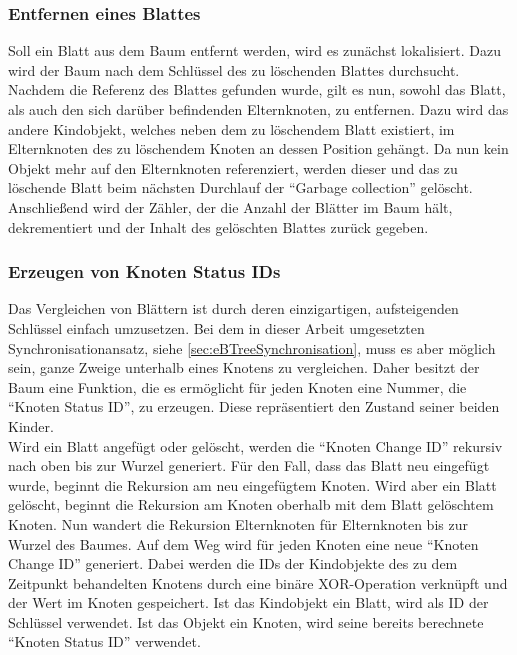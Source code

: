 \documentclass[a4paper,11pt,oneside,%
headsepline,												%
footsepline,												%
bibtotocnumbered									%
]{scrreprt}
\begin{document}
\subsubsection{Entfernen eines Blattes}
Soll ein Blatt aus dem Baum entfernt werden, wird es zunächst lokalisiert. Dazu wird der Baum nach dem Schlüssel des zu löschenden Blattes durchsucht. Nachdem die Referenz des Blattes gefunden wurde, gilt es nun, sowohl das Blatt, als auch den sich darüber befindenden Elternknoten, zu entfernen. Dazu wird das andere Kindobjekt, welches neben dem zu löschendem Blatt existiert, im Elternknoten des  zu löschendem Knoten an dessen Position gehängt. Da nun kein Objekt mehr auf den Elternknoten referenziert, werden dieser und das zu löschende Blatt beim nächsten Durchlauf der \enquote{Garbage collection} gelöscht. Anschließend wird der Zähler, der die Anzahl der Blätter im Baum hält, dekrementiert und der Inhalt des gelöschten Blattes zurück gegeben.
\subsubsection{Erzeugen von Knoten Status IDs}
Das Vergleichen von Blättern ist durch deren einzigartigen, aufsteigenden Schlüssel einfach umzusetzen. Bei dem in dieser Arbeit umgesetzten Synchronisationansatz, siehe \autoref{sec:eBTreeSynchronisation}, muss es aber möglich sein, ganze Zweige unterhalb eines Knotens zu vergleichen. Daher besitzt der Baum eine Funktion, die es ermöglicht für jeden Knoten eine Nummer, die \enquote{Knoten Status ID}, zu erzeugen. Diese repräsentiert den Zustand seiner beiden Kinder.\\ Wird ein Blatt angefügt oder gelöscht, werden die \enquote{Knoten Change ID} rekursiv nach oben bis zur Wurzel generiert. Für den Fall, dass das Blatt neu eingefügt wurde, beginnt die Rekursion am neu eingefügtem Knoten. Wird aber ein Blatt gelöscht, beginnt die Rekursion am Knoten oberhalb mit dem Blatt gelöschtem Knoten. Nun wandert die Rekursion Elternknoten für Elternknoten bis zur Wurzel des Baumes. Auf dem Weg wird für jeden Knoten eine neue \enquote{Knoten Change ID} generiert. Dabei werden die IDs der Kindobjekte des zu dem Zeitpunkt behandelten Knotens durch eine binäre XOR-Operation verknüpft und der Wert im Knoten gespeichert. Ist das Kindobjekt ein Blatt, wird als ID der Schlüssel verwendet. Ist das Objekt ein Knoten, wird seine bereits berechnete \enquote{Knoten Status ID} verwendet.
\end{document}
